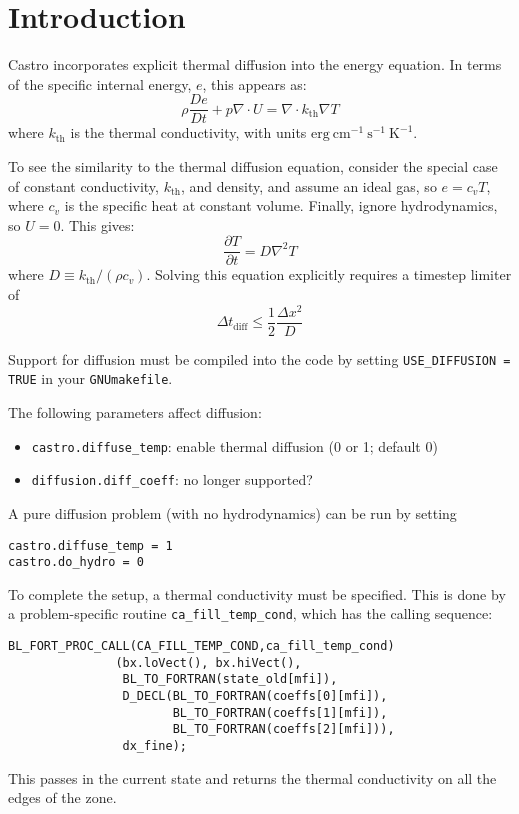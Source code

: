 \section{Introduction}

Castro incorporates explicit thermal diffusion into the energy equation.  
In terms of the specific internal energy, $e$, this appears as:
\begin{equation}
\rho \frac{De}{Dt} + p \nabla \cdot U = \nabla \cdot k_\mathrm{th} \nabla T
\end{equation}
where $k_\mathrm{th}$ is the thermal conductivity, with units
$\mathrm{erg~cm^{-1}~s^{-1}~K^{-1}}$.

To see the similarity to the thermal diffusion equation, consider the special
case of constant conductivity, $k_\mathrm{th}$, and density, and assume an
ideal gas, so $e = c_v T$, where $c_v$ is the specific heat at constant volume.
Finally, ignore hydrodynamics, so $U = 0$.  This gives:
\begin{equation}
\frac{\partial T}{\partial t} = D \nabla^2 T
\end{equation}
where $D \equiv k_\mathrm{th}/(\rho c_v)$.  Solving this equation explicitly requires
a timestep limiter of
\begin{equation}
\Delta t_\mathrm{diff} \le \frac{1}{2} \frac{\Delta x^2}{D}
\end{equation}

Support for diffusion must be compiled into the code by setting
{\tt USE\_DIFFUSION = TRUE} in your {\tt GNUmakefile}.


The following parameters affect diffusion:
\begin{itemize}
\item {\tt castro.diffuse\_temp}:  enable thermal diffusion (0 or 1; default 0)

\item {\tt diffusion.diff\_coeff}: {\color{red} no longer supported?}
\end{itemize}

A pure diffusion problem (with no hydrodynamics) can be run by setting
\begin{verbatim}
castro.diffuse_temp = 1
castro.do_hydro = 0
\end{verbatim}

To complete the setup, a thermal conductivity must be specified.
This is done by a problem-specific routine {\tt ca\_fill\_temp\_cond},
which has the calling sequence:
\begin{verbatim}
BL_FORT_PROC_CALL(CA_FILL_TEMP_COND,ca_fill_temp_cond)
               (bx.loVect(), bx.hiVect(),
                BL_TO_FORTRAN(state_old[mfi]),
                D_DECL(BL_TO_FORTRAN(coeffs[0][mfi]),
                       BL_TO_FORTRAN(coeffs[1][mfi]),
                       BL_TO_FORTRAN(coeffs[2][mfi])),
                dx_fine);
\end{verbatim}
This passes in the current state and returns the thermal conductivity
on all the edges of the zone.

